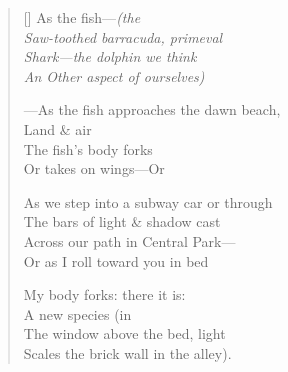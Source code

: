 \label{ch:in_a_dark_corner}
\settowidth{\versewidth}{As we step into a subway car or through}
\begin{verse}[\versewidth]
As the fish---\textit{(the\\
Saw-toothed barracuda, primeval\\
Shark---the dolphin we think\\
An Other aspect of ourselves)}

---As the fish approaches the dawn beach,\\
Land \& air\\
The fish's body forks\\
Or takes on wings---Or

As we step into a subway car or through\\
The bars of light \& shadow cast\\
Across our path in Central Park---\\
Or as I roll toward you in bed

My body forks: there it is:\\
A new species \qquad (in\\
The window above the bed, light\\
Scales the brick wall in the alley).
\end{verse}
